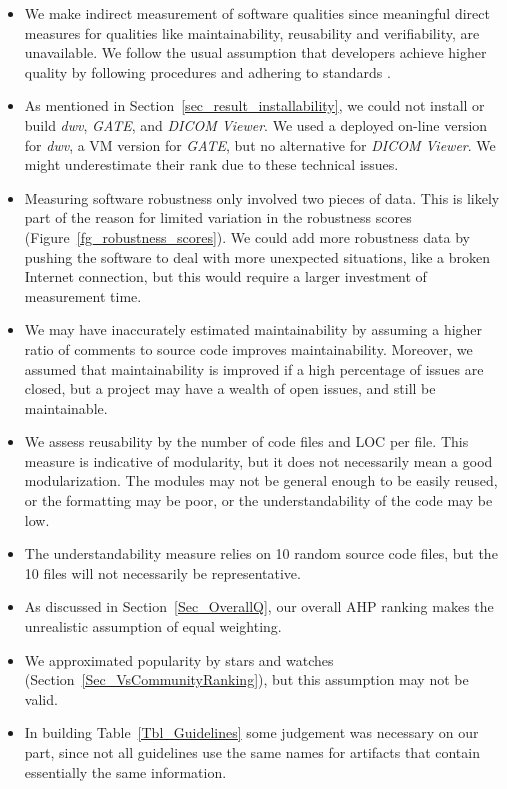 \documentclass[11pt]{article}
\begin{document}
\begin{itemize}
\item We make indirect measurement of software qualities since meaningful direct
measures for qualities like maintainability, reusability and verifiability, are
unavailable.  We follow the usual assumption that developers achieve higher
quality by following procedures and adhering to standards \cite[p.\
112]{VanVliet2000}.
\item As mentioned in Section~\ref{sec_result_installability}, we could not
install or build \textit{dwv}, \textit{GATE}, and \textit{DICOM Viewer}. We used
a deployed on-line version for \textit{dwv}, a VM version for \textit{GATE}, but
no alternative for \textit{DICOM Viewer}. We might underestimate their rank due
to these technical issues.
\item Measuring software robustness only involved two pieces of data. This is
likely part of the reason for limited variation in the robustness scores
(Figure~\ref{fg_robustness_scores}). We could add more robustness data by
pushing the software to deal with more unexpected situations, like a broken
Internet connection, but this would require a larger investment of measurement
time. 
\item We may have inaccurately estimated maintainability by assuming a higher
ratio of comments to source code improves maintainability. Moreover, we assumed
that maintainability is improved if a high percentage of issues are closed, but
a project may have a wealth of open issues, and still be maintainable.
\item We assess reusability by the number of code files and LOC per file. This
measure is indicative of modularity, but it does not necessarily mean a good
modularization. The modules may not be general enough to be easily reused, or
the formatting may be poor, or the understandability of the code may be low.
\item The understandability measure relies on 10 random source code files, but
the 10 files will not necessarily be representative. 
\item As discussed in Section~\ref{Sec_OverallQ}, our overall AHP ranking makes
the unrealistic assumption of equal weighting.
\item We approximated popularity by stars and watches
(Section~\ref{Sec_VsCommunityRanking}), but this assumption may not be valid. 
\item In building Table~\ref{Tbl_Guidelines} some judgement was necessary on our
part, since not all guidelines use the same names for artifacts that contain
essentially the same information.
\end{itemize}
\end{document}

